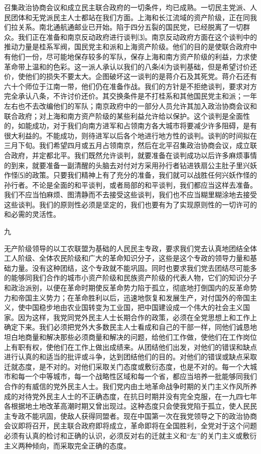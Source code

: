 \documentclass[UTF-8, a5paper, 12pt]{ctexart}
\begin{document}
召集政治协商会议和成立民主联合政府的一切条件，均已成熟。一切民主党派、人民团体和无党派民主人士都站在我们方面。上海和长江流域的资产阶级，正在同我们拉关系。南北通航通邮业已开始。陷于四分五裂的国民党，已经脱离了一切群众。我们正在准备和南京反动政府进行谈判⑶。南京反动政府方面在这个谈判中的推动力量是桂系军阀，国民党主和派和上海资产阶级。他们的目的是使联合政府中有他们一份，尽可能地保存较多的军队，保存上海和南方资产阶级的利益，力求使革命带上温和的色彩。这一派人承认以我们的八条⑷为谈判基础，但是希望讨价还价，使他们的损失不要太大。企图破坏这一谈判的是蒋介石及其死党。蒋介石还有六十个师位于江南一带，他们仍在准备作战。我们的方针是不拒绝谈判，要求对方完全承认八条，不许讨价还价。其交换条件是不打桂系和其他国民党主和派；一年左右也不去改编他们的军队；南京政府中的一部分人员允许其加入政治协商会议和联合政府；对上海和南方资产阶级的某些利益允许给以保护。这个谈判是全面性的，如能成功，对于我们向南方进军和占领南方各大城市将要减少许多阻碍，是有很大利益的。不能成功，则待进军以后各个地进行地方性的谈判。谈判的时间拟在三月下旬。我们希望四月或五月占领南京，然后在北平召集政治协商会议，成立联合政府，并定都北平。我们既然允许谈判，就要准备在谈判成功以后许多麻烦事情的到来，就要准备一副清醒的头脑去对付对方采用孙行者钻进铁扇公主肚子里兴妖作怪⑸的政策。只要我们精神上有了充分的准备，我们就可以战胜任何兴妖作怪的孙行者。不论是全面的和平谈判，或者局部的和平谈判，我们都应当这样去准备。我们不应当怕麻烦、图清静而不去接受这些谈判，我们也不应当糊里糊涂地去接受这些谈判。我们的原则性必须是坚定的，我们也要有为了实现原则性的一切许可的和必需的灵活性。

九

无产阶级领导的以工农联盟为基础的人民民主专政，要求我们党去认真地团结全体工人阶级、全体农民阶级和广大的革命知识分子，这些是这个专政的领导力量和基础力量。没有这种团结，这个专政就不能巩固。同时也要求我们党去团结尽可能多的能够同我们合作的城市小资产阶级和民族资产阶级的代表人物，它们的知识分子和政治派别，以便在革命时期使反革命势力陷于孤立，彻底地打倒国内的反革命势力和帝国主义势力；在革命胜利以后，迅速地恢复和发展生产，对付国外的帝国主义，使中国稳步地由农业国转变为工业国，把中国建设成一个伟大的社会主义国家。因为这样，我党同党外民主人士长期合作的政策，必须在全党思想上和工作上确定下来。我们必须把党外大多数民主人士看成和自己的干部一样，同他们诚恳地坦白地商量和解决那些必须商量和解决的问题，给他们工作做，使他们在工作岗位上有职有权，使他们在工作上做出成绩来。从团结他们出发，对他们的错误和缺点进行认真的和适当的批评或斗争，达到团结他们的目的。对他们的错误或缺点采取迁就态度，是不对的。对他们采取关门态度或敷衍态度，也是不对的。每一个大城市和每一个中等城市，每一个战略性区域和每一个省，都应当培养一批能够同我们合作的有威信的党外民主人士。我们党内由土地革命战争时期的关门主义作风所养成的对待党外民主人士的不正确态度，在抗日时期并没有完全克服，在一九四七年各根据地土地改革高潮时期又曾出现过。这种态度只会使我党陷于孤立，使人民民主专政不能巩固，使敌人获得同盟者。现在中国第一次在我党领导之下的政治协商会议即将召开，民主联合政府即将成立，革命即将在全国胜利，全党对于这个问题必须有认真的检讨和正确的认识，必须反对右的迁就主义和“左”的关门主义或敷衍主义两种倾向，而采取完全正确的态度。
\end{document}
